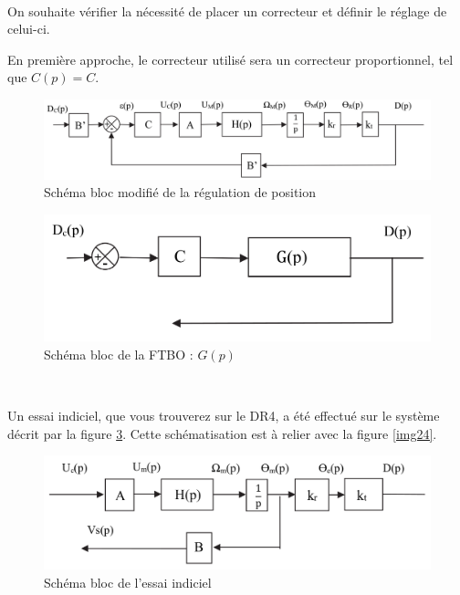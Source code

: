 ~\

On souhaite vérifier la nécessité de placer un correcteur et définir le réglage de celui-ci.

En première approche, le correcteur utilisé sera un correcteur proportionnel, tel que $C(p)=C$.


\begin{figure}[!h]
\centering\includegraphics[width=0.75\linewidth]{img/fig25}
 \caption{Schéma bloc modifié de la régulation de position}
 \label{img25}
\end{figure}


\begin{figure}[!h]
\centering\includegraphics[width=0.45\linewidth]{img/fig26}
 \caption{Schéma bloc de la FTBO : $G(p)$}
 \label{img26}
\end{figure}


~\

Un essai indiciel, que vous trouverez sur le DR4, a été effectué sur le système décrit par la figure \ref{img27}. Cette schématisation est à relier avec la figure \ref{img24}.

\begin{figure}[!h]
\centering\includegraphics[width=0.55\linewidth]{img/fig27}
 \caption{Schéma bloc de l’essai indiciel}
 \label{img27}
\end{figure}

